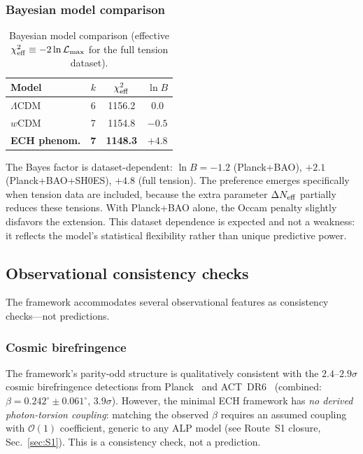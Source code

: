 \documentclass[aps,prd,twocolumn,superscriptaddress,showpacs,preprintnumbers,
  nofootinbib,longbibliography,floatfix]{revtex4-2}
\newcommand{\Neff}{N_{\rm eff}}
\begin{document}
\subsubsection{Bayesian model comparison}

\begin{table}[h]
\caption{\label{tab:modelcomp} Bayesian model comparison (effective
$\chi^2_{\rm eff} \equiv -2\ln\mathcal{L}_{\rm max}$ for the full
tension dataset).}
\begin{ruledtabular}
\begin{tabular}{lccc}
Model & $k$ & $\chi^2_{\rm eff}$ & $\ln B$ \\
\hline
$\Lambda$CDM & 6 & 1156.2 & 0.0 \\
$w$CDM & 7 & 1154.8 & $-0.5$ \\
\textbf{ECH phenom.} & \textbf{7} & \textbf{1148.3} & $\mathbf{+4.8}$ \\
\end{tabular}
\end{ruledtabular}
\end{table}

The Bayes factor is dataset-dependent: $\ln B = -1.2$ (Planck+BAO), $+2.1$
(Planck+BAO+SH0ES), $+4.8$ (full tension). The preference emerges
specifically when tension data are included, because the extra parameter
$\Delta\Neff$ partially reduces these tensions. With Planck+BAO alone,
the Occam penalty slightly disfavors the extension. This dataset
dependence is expected and not a weakness: it reflects the model's
statistical flexibility rather than unique predictive power.

\subsection{Observational consistency checks}\label{sec:obs}

The framework accommodates several observational features as consistency
checks---not predictions.

\subsubsection{Cosmic birefringence}

The framework's parity-odd structure is qualitatively consistent with
the $2.4$--$2.9\sigma$ cosmic birefringence detections from
Planck~\cite{Eskilt2022} and ACT~DR6~\cite{DiegoPalazuelos2025}
(combined: $\beta = 0.242^\circ \pm 0.061^\circ$, $3.9\sigma$).
However, the minimal ECH framework has \textit{no derived photon-torsion
coupling}: matching the observed $\beta$ requires an assumed coupling
with $\mathcal{O}(1)$ coefficient, generic to any ALP model (see
Route~S1 closure, Sec.~\ref{sec:S1}). This is a consistency check,
not a prediction.
\end{document}
